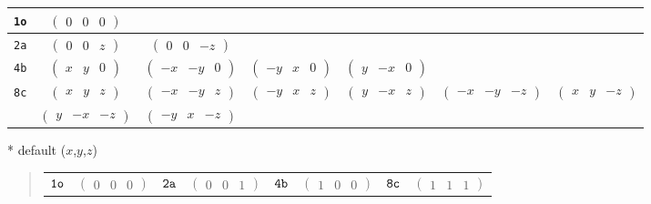 \documentclass[fleqn,9pt,landscape]{jsarticle}
\begin{document}
\begin{center}
\begin{longtable}{ccccccc}
{\tt 1o} & $ \begin{pmatrix} 0 & 0 & 0 \end{pmatrix} $ & $  $ & $  $ & $  $ & $  $ & $  $ \\ \hline
{\tt 2a} & $ \begin{pmatrix} 0 & 0 & z \end{pmatrix} $ & $ \begin{pmatrix} 0 & 0 & - z \end{pmatrix} $ & $  $ & $  $ & $  $ & $  $ \\ \hline
{\tt 4b} & $ \begin{pmatrix} x & y & 0 \end{pmatrix} $ & $ \begin{pmatrix} - x & - y & 0 \end{pmatrix} $ & $ \begin{pmatrix} - y & x & 0 \end{pmatrix} $ & $ \begin{pmatrix} y & - x & 0 \end{pmatrix} $ & $  $ & $  $ \\ \hline
{\tt 8c} & $ \begin{pmatrix} x & y & z \end{pmatrix} $ & $ \begin{pmatrix} - x & - y & z \end{pmatrix} $ & $ \begin{pmatrix} - y & x & z \end{pmatrix} $ & $ \begin{pmatrix} y & - x & z \end{pmatrix} $ & $ \begin{pmatrix} - x & - y & - z \end{pmatrix} $ & $ \begin{pmatrix} x & y & - z \end{pmatrix} $ \\
& $ \begin{pmatrix} y & - x & - z \end{pmatrix} $ & $ \begin{pmatrix} - y & x & - z \end{pmatrix} $ & $  $ & $  $ & $  $ & $  $ \\
\end{longtable}
\end{center}
* default ($x$,$y$,$z$)
\begin{quote}
\begin{tabular}{cccccccc}
$ {\tt 1o} $ & $ \begin{pmatrix} 0 & 0 & 0 \end{pmatrix} $ & $ {\tt 2a} $ & $ \begin{pmatrix} 0 & 0 & 1 \end{pmatrix} $ & $ {\tt 4b} $ & $ \begin{pmatrix} 1 & 0 & 0 \end{pmatrix} $ & $ {\tt 8c} $ & $ \begin{pmatrix} 1 & 1 & 1 \end{pmatrix} $
\end{tabular}
\end{quote}
\end{document}
